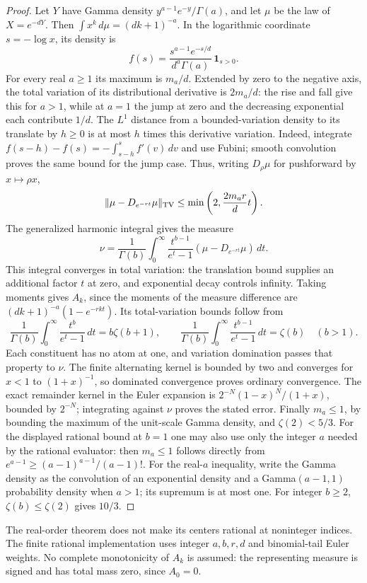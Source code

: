 \begin{proof}
Let $Y$ have Gamma density $y^{a-1}e^{-y}/\Gamma(a)$, and let $\mu$ be
the law of $X=e^{-dY}$. Then $\int x^k\,d\mu=(dk+1)^{-a}$.
In the logarithmic coordinate $s=-\log x$, its density is
\[
 f(s)=\frac{s^{a-1}e^{-s/d}}{d^a\Gamma(a)}\,\mathbf1_{s>0}.
\]
For every real $a\ge1$ its maximum is $m_a/d$. Extended by zero to the
negative axis, the total variation of its distributional derivative is
$2m_a/d$: the rise and fall give this for $a>1$, while at $a=1$ the
jump at zero and the decreasing exponential each contribute $1/d$.
The $L^1$ distance from a bounded-variation density to its translate by
$h\ge0$ is at most $h$ times this derivative variation. Indeed, integrate
$f(s-h)-f(s)=-\int_{s-h}^s f'(v)\,dv$ and use Fubini; smooth convolution
proves the same bound for the jump case. Thus, writing $D_\rho\mu$ for
pushforward by $x\mapsto\rho x$,
\[
 \|\mu-D_{e^{-rt}}\mu\|_{\rm TV}
 \le\min\left(2,\frac{2m_ar}{d}t\right).
\]
The generalized harmonic integral gives the measure
\[
 \nu=\frac1{\Gamma(b)}\int_0^\infty
   \frac{t^{b-1}}{e^t-1}(\mu-D_{e^{-rt}}\mu)\,dt.
\]
This integral converges in total variation: the translation bound supplies
an additional factor $t$ at zero, and exponential decay controls infinity.
Taking moments gives $A_k$, since the moments of the measure difference are
$(dk+1)^{-a}(1-e^{-rkt})$. Its total-variation bounds follow from
\[
 \frac1{\Gamma(b)}\int_0^\infty\frac{t^b}{e^t-1}\,dt
 =b\zeta(b+1),\qquad
 \frac1{\Gamma(b)}\int_0^\infty\frac{t^{b-1}}{e^t-1}\,dt
 =\zeta(b)\quad(b>1).
\]
Each constituent has no atom at one, and variation domination passes that
property to $\nu$. The finite alternating kernel is bounded by two and
converges for $x<1$ to $(1+x)^{-1}$, so dominated convergence proves
ordinary convergence. The exact remainder kernel in the Euler expansion is
$2^{-N}(1-x)^N/(1+x)$, bounded by $2^{-N}$; integrating against $\nu$
proves the stated error. Finally $m_a\le1$, by bounding the maximum of the
unit-scale Gamma density, and $\zeta(2)<5/3$. For the displayed rational
bound at $b=1$ one may also use only the integer $a$ needed by the rational
evaluator: then $m_a\le1$ follows directly from
$e^{a-1}\ge(a-1)^{a-1}/(a-1)!$. For the real-$a$ inequality, write the
Gamma density as the convolution of an exponential density and a
Gamma$(a-1,1)$ probability density when $a>1$; its supremum is at most one.
For integer $b\ge2$, $\zeta(b)\le\zeta(2)$ gives $10/3$.
\end{proof}
The real-order theorem does not make its centers rational at noninteger
indices. The finite rational implementation uses integer $a,b,r,d$ and
binomial-tail Euler weights. No complete monotonicity of $A_k$ is assumed:
the representing measure is signed and has total mass zero, since $A_0=0$.
